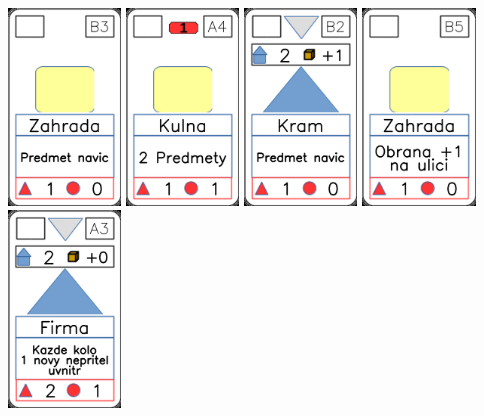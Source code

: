 \documentclass[a4paper]{article}
\begin{document}
	\includegraphics[width=3.0cm]{img-2_22}
	\includegraphics[width=3.0cm]{img-2_18}
	\includegraphics[width=3.0cm]{img-3_6}
	\includegraphics[width=3.0cm]{img-2_24}
	\includegraphics[width=3.0cm]{img-3_17}
\end{document}
